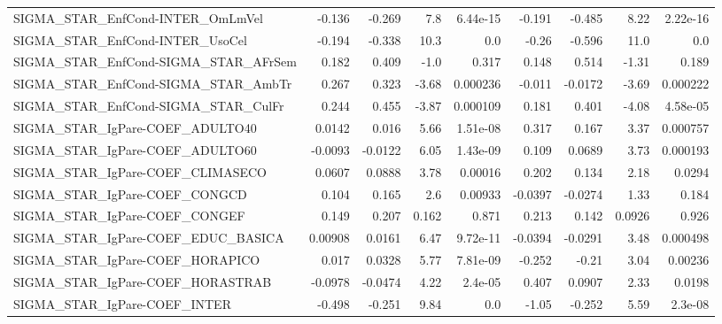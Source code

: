 \begin{tabular}{lrrrrrrrr}
SIGMA\_STAR\_EnfCond-INTER\_OmLmVel      &      -0.136 &       -0.269 &     7.8 & 6.44e-15 &     -0.191 &      -0.485 &         8.22 &      2.22e-16 \\
SIGMA\_STAR\_EnfCond-INTER\_UsoCel       &      -0.194 &       -0.338 &    10.3 &      0.0 &      -0.26 &      -0.596 &         11.0 &           0.0 \\
SIGMA\_STAR\_EnfCond-SIGMA\_STAR\_AFrSem  &       0.182 &        0.409 &    -1.0 &    0.317 &      0.148 &       0.514 &        -1.31 &         0.189 \\
SIGMA\_STAR\_EnfCond-SIGMA\_STAR\_AmbTr   &       0.267 &        0.323 &   -3.68 & 0.000236 &     -0.011 &     -0.0172 &        -3.69 &      0.000222 \\
SIGMA\_STAR\_EnfCond-SIGMA\_STAR\_CulFr   &       0.244 &        0.455 &   -3.87 & 0.000109 &      0.181 &       0.401 &        -4.08 &      4.58e-05 \\
SIGMA\_STAR\_IgPare-COEF\_ADULTO40       &      0.0142 &        0.016 &    5.66 & 1.51e-08 &      0.317 &       0.167 &         3.37 &      0.000757 \\
SIGMA\_STAR\_IgPare-COEF\_ADULTO60       &     -0.0093 &      -0.0122 &    6.05 & 1.43e-09 &      0.109 &      0.0689 &         3.73 &      0.000193 \\
SIGMA\_STAR\_IgPare-COEF\_CLIMASECO      &      0.0607 &       0.0888 &    3.78 &  0.00016 &      0.202 &       0.134 &         2.18 &        0.0294 \\
SIGMA\_STAR\_IgPare-COEF\_CONGCD         &       0.104 &        0.165 &     2.6 &  0.00933 &    -0.0397 &     -0.0274 &         1.33 &         0.184 \\
SIGMA\_STAR\_IgPare-COEF\_CONGEF         &       0.149 &        0.207 &   0.162 &    0.871 &      0.213 &       0.142 &       0.0926 &         0.926 \\
SIGMA\_STAR\_IgPare-COEF\_EDUC\_BASICA    &     0.00908 &       0.0161 &    6.47 & 9.72e-11 &    -0.0394 &     -0.0291 &         3.48 &      0.000498 \\
SIGMA\_STAR\_IgPare-COEF\_HORAPICO       &       0.017 &       0.0328 &    5.77 & 7.81e-09 &     -0.252 &       -0.21 &         3.04 &       0.00236 \\
SIGMA\_STAR\_IgPare-COEF\_HORASTRAB      &     -0.0978 &      -0.0474 &    4.22 &  2.4e-05 &      0.407 &      0.0907 &         2.33 &        0.0198 \\
SIGMA\_STAR\_IgPare-COEF\_INTER          &      -0.498 &       -0.251 &    9.84 &      0.0 &      -1.05 &      -0.252 &         5.59 &       2.3e-08 \\

\end{tabular}
